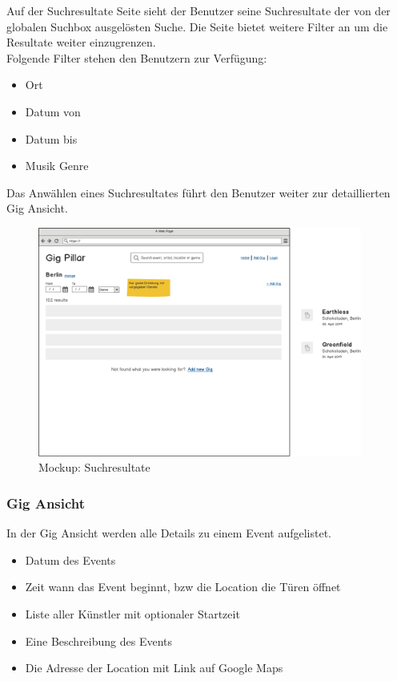 Auf der Suchresultate Seite sieht der Benutzer seine Suchresultate der von der
globalen Suchbox ausgelösten Suche. Die Seite bietet weitere Filter an um die
Resultate weiter einzugrenzen.\\

\noindent
Folgende Filter stehen den Benutzern zur Verfügung:


\begin{itemize}
  \tightlist{}
  \item{} Ort
  \item{} Datum von
  \item{} Datum bis
  \item{} Musik Genre
\end{itemize}

\noindent
Das Anwählen eines Suchresultates führt den Benutzer weiter zur detaillierten
Gig Ansicht.

\begin{figure}[!htb]
  \centering
  \includegraphics[width=0.95\textwidth]{mockups/search-result.png}
  \caption{Mockup: Suchresultate}
\end{figure}

\clearpage
\subsubsection{Gig Ansicht}

In der Gig Ansicht werden alle Details zu einem Event aufgelistet.

\begin{itemize}
  \tightlist{}
  \item{} Datum des Events
  \item{} Zeit wann das Event beginnt, bzw die Location die Türen öffnet
  \item{} Liste aller Künstler mit optionaler Startzeit
  \item{} Eine Beschreibung des Events
  \item{} Die Adresse der Location mit Link auf Google Maps
\end{itemize}

